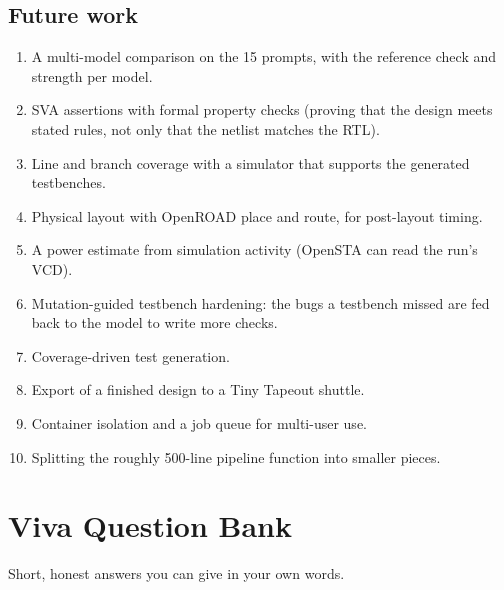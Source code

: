 \section{Future work}

\begin{enumerate}
  \item A multi-model comparison on the 15 prompts, with the reference check and strength per model.
  \item SVA assertions with formal property checks (proving that the design meets stated rules, not only that the netlist matches the RTL).
  \item Line and branch coverage with a simulator that supports the generated testbenches.
  \item Physical layout with OpenROAD place and route, for post-layout timing.
  \item A power estimate from simulation activity (OpenSTA can read the run's VCD).
  \item Mutation-guided testbench hardening: the bugs a testbench missed are fed back to the model to write more checks.
  \item Coverage-driven test generation.
  \item Export of a finished design to a Tiny Tapeout shuttle.
  \item Container isolation and a job queue for multi-user use.
  \item Splitting the roughly 500-line pipeline function into smaller pieces.
\end{enumerate}

\chapter{Viva Question Bank}
\label{ch:vivaqa}

Short, honest answers you can give in your own words.

